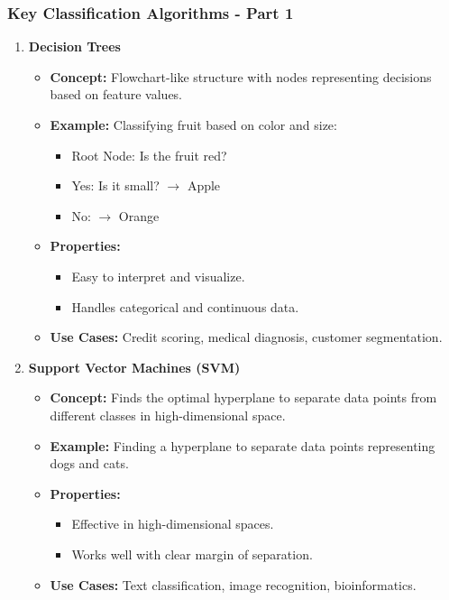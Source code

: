 \documentclass[aspectratio=169]{beamer}
\begin{document}
\begin{frame}[fragile]
    \frametitle{Key Classification Algorithms - Part 1}
    \begin{enumerate}
        \item \textbf{Decision Trees}
            \begin{itemize}
                \item \textbf{Concept:} Flowchart-like structure with nodes representing decisions based on feature values.
                \item \textbf{Example:} Classifying fruit based on color and size:
                    \begin{itemize}
                        \item Root Node: Is the fruit red?
                        \item Yes: Is it small? $\rightarrow$ Apple
                        \item No: $\rightarrow$ Orange
                    \end{itemize}
                \item \textbf{Properties:} 
                    \begin{itemize}
                        \item Easy to interpret and visualize.
                        \item Handles categorical and continuous data.
                    \end{itemize}
                \item \textbf{Use Cases:} Credit scoring, medical diagnosis, customer segmentation.
            \end{itemize}
        
        \item \textbf{Support Vector Machines (SVM)}
            \begin{itemize}
                \item \textbf{Concept:} Finds the optimal hyperplane to separate data points from different classes in high-dimensional space.
                \item \textbf{Example:} Finding a hyperplane to separate data points representing dogs and cats.
                \item \textbf{Properties:}
                    \begin{itemize}
                        \item Effective in high-dimensional spaces.
                        \item Works well with clear margin of separation.
                    \end{itemize}
                \item \textbf{Use Cases:} Text classification, image recognition, bioinformatics.
            \end{itemize}
    \end{enumerate}
\end{frame}
\end{document}
